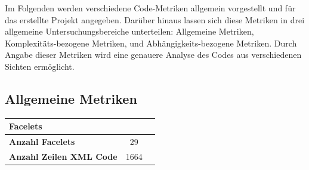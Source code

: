 \documentclass{article}
\begin{document}
Im Folgenden werden verschiedene Code-Metriken allgemein vorgestellt und für das erstellte Projekt angegeben.
Darüber hinaus lassen sich diese Metriken in drei allgemeine Untersuchungsbereiche unterteilen:
Allgemeine Metriken, Komplexitäts-bezogene Metriken, und Abhängigkeits-bezogene Metriken.
Durch Angabe dieser Metriken wird eine genauere Analyse des Codes aus verschiedenen Sichten ermöglicht.

\subsection{Allgemeine Metriken}

\begin{longtable}{@{\extracolsep{\fill}}lcl@{}}
\toprule
\multicolumn{2}{l}{\textbf{Facelets}} \\* \midrule
\endfirsthead
\endhead
\textbf{Anzahl Facelets} & 29 \\
\textbf{Anzahl Zeilen XML Code} & 1664 \\* \bottomrule
\end{longtable}
\end{document}
